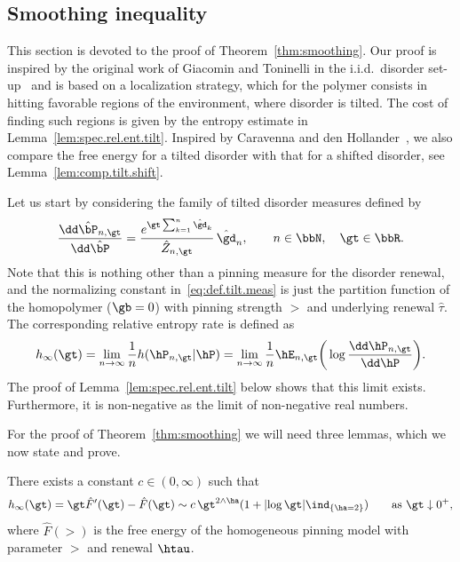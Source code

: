 \subsection{Smoothing inequality}\label{sec4.2}

This section is devoted to the proof of Theorem~\ref{thm:smoothing}. Our proof is inspired by the original work of Giacomin and Toninelli in the i.i.d.~disorder set-up~\cite{GiT2006} and is based on a localization strategy, which for the polymer consists in hitting favorable regions of the environment, where disorder is tilted. The cost of finding such regions is given by the entropy estimate in Lemma~\ref{lem:spec.rel.ent.tilt}. Inspired by Caravenna and den Hollander~\cite{CadH13}, we also compare the free energy for a tilted disorder with that for a shifted disorder, see Lemma~\ref{lem:comp.tilt.shift}.

Let us start by considering the family of tilted disorder measures defined by
\begin{equation}\label{eq:def.tilt.meas}
\frac{\dd \hat \bP_{n,\gt}}{\dd \hat \bP} = \frac{e^{\gt \sum_{k=1}^n \hat \gd_k}}{\hat Z_{n,\gt}} \, \hat \gd_n, \qquad n \in \bbN, \quad \gt \in \bbR.
\end{equation}
Note that this is nothing other than a pinning measure for the disorder renewal, and the normalizing constant in~\eqref{eq:def.tilt.meas} is just the partition function of the homopolymer ($\gb = 0$) with pinning strength $\gt$ and underlying renewal $\hat\tau$. The corresponding relative entropy rate is defined as
\begin{equation}\label{eq:def.spec.rel.ent}
h_\infty(\gt) = \lim_{n \to \infty} \frac{1}{n} h(\hP_{n,\gt} | \hP) = \lim_{n \to \infty} \frac{1}{n} \hE_{n,\gt} \bigg(\log \frac{\dd \hP_{n,\gt}}{\dd \hP} \bigg).
\end{equation}
The proof of Lemma~\ref{lem:spec.rel.ent.tilt} below shows that this limit exists. Furthermore, it is non-negative as the limit of non-negative real numbers.

For the proof of Theorem~\ref{thm:smoothing} we will need three lemmas, which we now state and prove.

\begin{lemm} \label{lem:spec.rel.ent.tilt}
There exists a constant $c \in (0,\infty)$ such that
\begin{equation}
h_\infty(\gt) = \gt \hat F'(\gt) - \hat F(\gt) \sim c \, \gt^{2 \wedge \ha}{(1+ |{\log \gt}| \ind_{\{\ha = 2\}})} \qquad \text{as } \gt \downarrow 0^+,
\end{equation}
where $\hat F(\gt)$ is the free energy of the homogeneous pinning model with parameter $\gt$ and renewal $\htau$.
\end{lemm}

